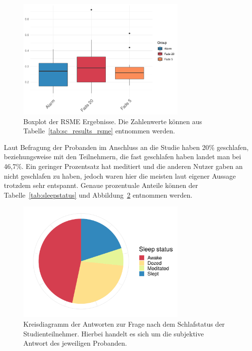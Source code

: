 \begin{figure}[H]
	\centering
	\includegraphics[width=0.75\textwidth]{./_StudyResults/rsme}
	\caption{Boxplot der RSME Ergebnisse. Die Zahlenwerte können aus Tabelle~\ref{tab:sc_results_rsme} entnommen werden.}
	\label{fig:rsme_vis}
\end{figure}

Laut Befragung der Probanden im Anschluss an die Studie haben 20\% geschlafen, beziehungsweise mit den Teilnehmern, die fast geschlafen haben landet man bei 46,7\%. Ein geringer Prozentsatz hat meditiert und die anderen Nutzer gaben an nicht geschlafen zu haben, jedoch waren hier die meisten laut eigener Aussage trotzdem sehr entspannt. Genaue prozentuale Anteile können der Tabelle~\ref{tab:sleepstatus} und Abbildung~\ref{fig:slept} entnommen werden.

\begin{figure}[H]
	\centering
	\includegraphics[width=0.75\textwidth]{./_StudyResults/slept}
	\caption{Kreisdiagramm der Antworten zur Frage nach dem Schlafstatus der Studienteilnehmer. Hierbei handelt es sich um die subjektive Antwort des jeweiligen Probanden.}
	\label{fig:slept}
\end{figure}

